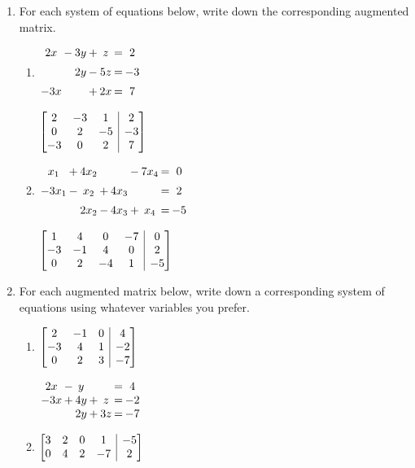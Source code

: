 \documentclass[12pt]{article}
\makeatletter
\newenvironment{amatrix}[1]{%
  \left[\begin{array}{@{}*{#1}{c}|c@{}}
}{%
  \end{array}\right]
}
\newcommand{\bam}{\begin{amatrix}}
\newcommand{\eam}{\end{amatrix}}
\makeatother
\begin{document}
 \begin{enumerate}
\item For each system of equations below, write down the corresponding augmented matrix.
\begin{multicols}{2}
\begin{enumerate}
 \item $\arraycolsep=1pt\begin{array}{ccccccc}2x&-&3y&+&z&=&2\\[5pt] & &2y&-&5z&=&-3\\[5pt] -3x& & &+&2x&=&7\end{array}$

\medskip

 $\bam{3}2&-3&1&2\\0&2&-5&-3\\-3&0&2&7\eam$

 \item $\arraycolsep=1pt\begin{array}{ccccccccc}x_1&+&4x_2& & &-&7x_4&=&0\\[5pt]-3x_1&-&x_2&+&4x_3& & &=&2\\[5pt] & &2x_2&-&4x_3&+&x_4&=&-5\end{array}$
 
 \medskip
 
 $\bam{4}1&4&0&-7&0\\-3&-1&4&0&2\\0&2&-4&1&-5\eam$
 \end{enumerate}
\end{multicols}

\bigskip

\item For each augmented matrix below, write down a corresponding system of equations using whatever variables you prefer.
\begin{multicols}{2}
\begin{enumerate}
 \item $\bam{3}2&-1&0&4\\-3&4&1&-2\\0&2&3&-7\eam$

\medskip

 $\arraycolsep=1pt\begin{array}{ccccccc}
 2x&-&y& & &=&4\\-3x&+&4y&+&z&=&-2\\ & &2y&+&3z&=&-7\end{array}$

 \item $\bam{4}3&2&0&1&-5\\0&4&2&-7&2\eam$
 

\end{enumerate}
\end{multicols}
\end{enumerate}
\end{document}
